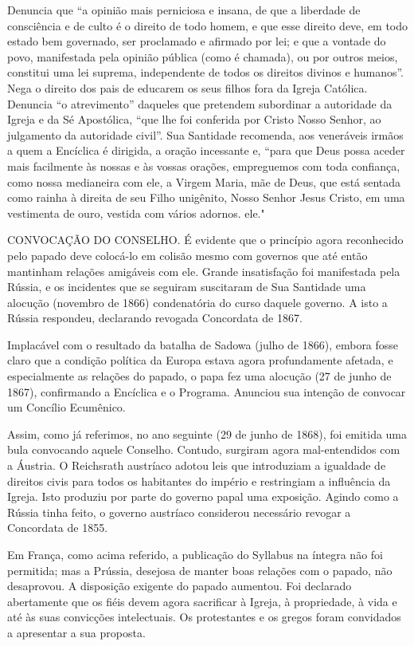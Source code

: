 \documentclass[11pt,a5paper,twoside,openany]{book}
\begin{document}
Denuncia que “a opinião mais perniciosa e insana, de que a liberdade de consciência e de culto é o direito de todo homem, e que esse direito deve, em todo estado bem governado, ser proclamado e afirmado por lei; e que a vontade do povo, manifestada pela opinião pública (como é chamada), ou por outros meios, constitui uma lei suprema, independente de todos os direitos divinos e humanos”. Nega o direito dos pais de educarem os seus filhos fora da Igreja Católica. Denuncia “o atrevimento” daqueles que pretendem subordinar a autoridade da Igreja e da Sé Apostólica, “que lhe foi conferida por Cristo Nosso Senhor, ao julgamento da autoridade civil”. Sua Santidade recomenda, aos veneráveis irmãos a quem a Encíclica é dirigida, a oração incessante e, “para que Deus possa aceder mais facilmente às nossas e às vossas orações, empreguemos com toda confiança, como nossa medianeira com ele, a Virgem Maria, mãe de Deus, que está sentada como rainha à direita de seu Filho unigênito, Nosso Senhor Jesus Cristo, em uma vestimenta de ouro, vestida com vários adornos. ele."

CONVOCAÇÃO DO CONSELHO. É evidente que o princípio agora reconhecido pelo papado deve colocá-lo em colisão mesmo com governos que até então mantinham relações amigáveis ​​com ele. Grande insatisfação foi manifestada pela Rússia, e os incidentes que se seguiram suscitaram de Sua Santidade uma alocução (novembro de 1866) condenatória do curso daquele governo. A isto a Rússia respondeu, declarando revogada Concordata de 1867.

Implacável com o resultado da batalha de Sadowa (julho de 1866), embora fosse claro que a condição política da Europa estava agora profundamente afetada, e especialmente as relações do papado, o papa fez uma alocução (27 de junho de 1867), confirmando a Encíclica e o Programa. Anunciou sua intenção de convocar um Concílio Ecumênico.

Assim, como já referimos, no ano seguinte (29 de junho de 1868), foi emitida uma bula convocando aquele Conselho. Contudo, surgiram agora mal-entendidos com a Áustria. O Reichsrath austríaco adotou leis que introduziam a igualdade de direitos civis para todos os habitantes do império e restringiam a influência da Igreja. Isto produziu por parte do governo papal uma exposição. Agindo como a Rússia tinha feito, o governo austríaco considerou necessário revogar a Concordata de 1855.

Em França, como acima referido, a publicação do Syllabus na íntegra não foi permitida; mas a Prússia, desejosa de manter boas relações com o papado, não desaprovou. A disposição exigente do papado aumentou. Foi declarado abertamente que os fiéis devem agora sacrificar à Igreja, à propriedade, à vida e até às suas convicções intelectuais. Os protestantes e os gregos foram convidados a apresentar a sua proposta.
\end{document}
